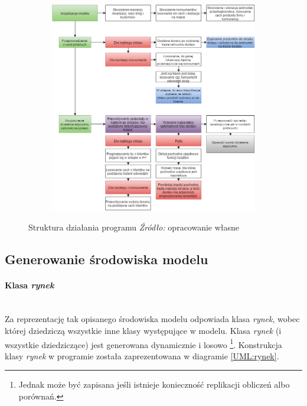 \documentclass[polish, twoside, 12pt, a4paper]{article}
\theoremstyle{definition}
\theoremstyle{plain}
\theoremstyle{remark}
\begin{document}
\begin{figure}[hbt]
  \centering
  \begin{subfigure}[t]{0.95\textwidth}
    \includegraphics[width=\textwidth]{pictures/Struktura.png}
  \end{subfigure}
  \captionsetup{margin=10pt,font=small,labelfont=bf,width=.8\textwidth}
  \caption[Struktura działania programu]{Struktura działania programu \textit{Źródło:} opracowanie własne}\label{fig:xxx1}
\end{figure}


\subsection{Generowanie środowiska modelu}
\paragraph{Klasa \textit{rynek}}\mbox{}\\
Za reprezentację tak opisanego środowiska modelu odpowiada klasa \textit{rynek}, wobec której dziedziczą wszystkie inne klasy występujące w modelu. Klasa \textit{rynek} (i wszystkie dziedziczące) jest generowana dynamicznie i losowo \footnote{Jednak może być zapisana jeśli istnieje konieczność replikacji obliczeń albo porównań.}.  Konstrukcja klasy \textit{rynek} w programie została zaprezentowana w diagramie \ref{UML:rynek}. \\
\end{document}
